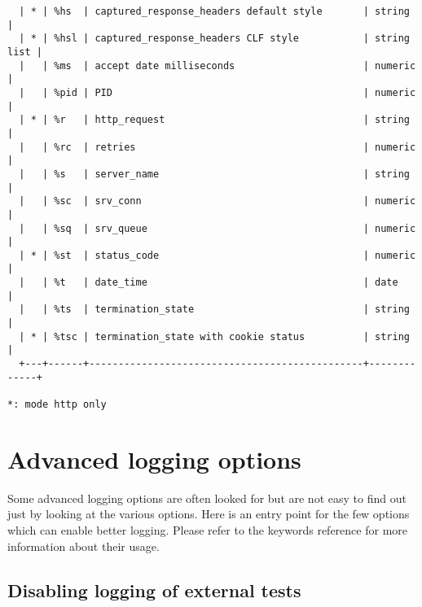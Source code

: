 \begin{verbatim}
  | * | %hs  | captured_response_headers default style       | string      |
  | * | %hsl | captured_response_headers CLF style           | string list |
  |   | %ms  | accept date milliseconds                      | numeric     |
  |   | %pid | PID                                           | numeric     |
  | * | %r   | http_request                                  | string      |
  |   | %rc  | retries                                       | numeric     |
  |   | %s   | server_name                                   | string      |
  |   | %sc  | srv_conn                                      | numeric     |
  |   | %sq  | srv_queue                                     | numeric     |
  | * | %st  | status_code                                   | numeric     |
  |   | %t   | date_time                                     | date        |
  |   | %ts  | termination_state                             | string      |
  | * | %tsc | termination_state with cookie status          | string      |
  +---+------+-----------------------------------------------+-------------+

*: mode http only
\end{verbatim}

\section{Advanced logging options}

Some advanced logging options are often looked for but are not easy to find out
just by looking at the various options. Here is an entry point for the few
options which can enable better logging. Please refer to the keywords reference
for more information about their usage.

\subsection{Disabling logging of external tests}

